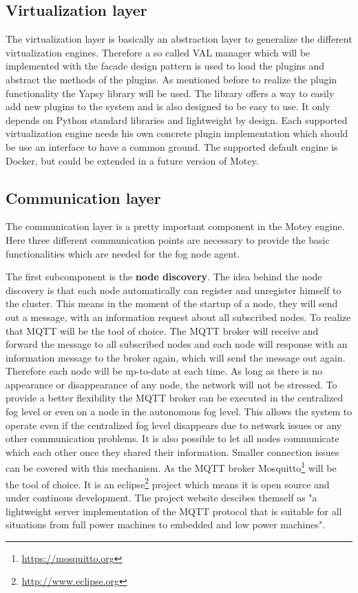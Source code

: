 \subsection{Virtualization layer}
The virtualization layer is basically an abstraction layer to generalize the different virtualization engines.
Therefore a so called \ac{VAL} manager which will be implemented with the facade design pattern is used to load the plugins and abstract the methods of the plugins.
As mentioned before to realize the plugin functionality the Yapsy library will be used.
The library offers a way to easily add new plugins to the system and is also designed to be easy to use.
It only depends on Python standard libraries and lightweight by design.
Each supported virtualization engine needs his own concrete plugin implementation which should be use an interface to have a common ground.
The supported default engine is Docker, but could be extended in a future version of Motey.


\subsection{Communication layer}
\label{subsection:CommunicationLayer}
The communication layer is a pretty important component in the Motey engine.
Here three different communication points are necessary to provide the basic functionalities which are needed for the fog node agent.

The first subcomponent is the \textbf{node discovery}.
The idea behind the node discovery is that each node automatically can register and unregister himself to the cluster.
This means in the moment of the startup of a node, they will send out a message, with an information request about all subscribed nodes.
To realize that \ac{MQTT} will be the tool of choice.
The \ac{MQTT} broker will receive and forward the message to all subscribed nodes and each node will response with an information message to the broker again, which will send the message out again.
Therefore each node will be up-to-date at each time.
As long as there is no appearance or disappearance of any node, the network will not be stressed.
To provide a better flexibility the \ac{MQTT} broker can be executed in the centralized fog level or even on a node in the autonomous fog level.
This allows the system to operate even if the centralized fog level disappears due to network issues or any other communication problems.
It is also possible to let all nodes communicate which each other once they shared their information.
Smaller connection issues can be covered with this mechanism.
As the \ac{MQTT} broker Mosquitto\footnote{\url{https://mosquitto.org}} will be the tool of choice.
It is an eclipse\footnote{\url{http://www.eclipse.org}} project which means it is open source and under continous development.
The project website descibes themself as "a lightweight server implementation of the MQTT protocol that is suitable for all situations from full power machines to embedded and low power machines"\autocite{Eclipse:Mosquitto}.

